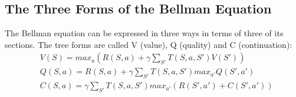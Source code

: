 \documentclass{article}
\begin{document}
\subsection{The Three Forms of the Bellman Equation}
The Bellman equation can be expressed in three ways in terms of three of its sections. The tree forms are called V (value), Q (quality) and C (continuation):
\begin{align}
  &V(S) = max_a \left( R(S, a) + \gamma \sum_{S'} T(S, a, S') V(S') \right)\\
  &Q(S, a) = R(S, a) + \gamma \sum_{S'} T(S, a, S') max_{a'} Q(S', a')\\
  &C(S, a) = \gamma \sum_{S'} T(S, a, S') max_{a'} \left( R(S', a') + C(S', a') \right)
\end{align}
\end{document}
